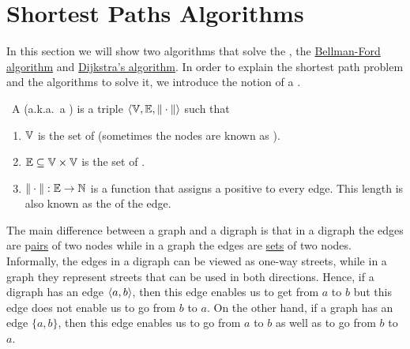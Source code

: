 \section{Shortest Paths Algorithms}
In this section we will show two algorithms that solve the
\href{https://en.wikipedia.org/wiki/Shortest_path_problem}{}, the 
\href{https://en.wikipedia.org/wiki/Bellman-Ford_algorithm}{Bellman-Ford algorithm} and
\href{https://en.wikipedia.org/wiki/Dijkstra%27s_algorithm}{Dijkstra's algorithm}.  
In order to explain the shortest path problem and the algorithms to solve it, we introduce the notion
of a \href{https://en.wikipedia.org/wiki/Directed_graph}{}.


\begin{Definition} \
  A  (a.k.a.~a ) is a triple 
  $\langle {\mathbb V}, {\mathbb E}, \|\cdot\| \rangle$ such that
  \begin{enumerate}
  \item ${\mathbb V}$ is the set of  (sometimes the nodes are known as ).
  \item ${\mathbb E} \subseteq {\mathbb V} \times {\mathbb V}$ is the set of \blue{edges}.
  \item $\|\cdot\|: {\mathbb E} \rightarrow {\mathbb N}$ is a function that assigns a positive  
        to every edge.  This length is also known as the \blue{weight} of the edge.
        \eox
  \end{enumerate}
\end{Definition}

\remark
The main difference between a graph and a digraph is that in a digraph the edges are 
\mbox{p\hspace{-0.15cm}\underline{\hspace{0.15cm}airs}} of two
nodes while in a graph the edges are \underline{sets} of two nodes.  Informally, the edges in a
digraph can be viewed as one-way streets, while in a graph they represent streets that can be used in both
directions.  Hence, if a digraph has an edge $\pair(a,b)$, then this edge enables us to get from $a$ to $b$ but
this edge does not enable us to go from $b$ to $a$.  On the other hand, if a graph has an edge $\{a,b\}$, then
this edge enables us to go from $a$ to $b$ as well as to go from $b$ to $a$.
\eox


